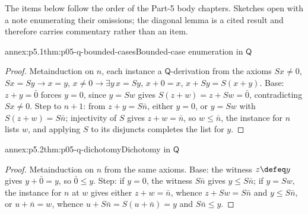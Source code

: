 \label{annex:p05}

The items below follow the order of the Part-5 body chapters.  Sketches
open with a note enumerating their omissions; the diagonal lemma is a
cited result and therefore carries commentary rather than an item.

\begin{annexitem}{annex:p5.1}{thm:p05-q-bounded-cases}{Bounded-case enumeration in \(\mathsf Q\)}
\begin{proof}
Metainduction on \(n\), each instance a \(\mathsf Q\)-derivation from
the axioms \(Sx\neq0\), \(Sx=Sy\to x=y\), \(x\neq0\to\exists y\,x=Sy\),
\(x+0=x\), \(x+Sy=S(x+y)\).  Base: \(z+y=\bar0\) forces \(y=0\), since
\(y=Sw\) gives \(S(z+w)=z+Sw=\bar0\), contradicting \(Sx\neq0\).  Step
to \(n+1\): from \(z+y=S\bar n\), either \(y=0\), or \(y=Sw\) with
\(S(z+w)=S\bar n\); injectivity of \(S\) gives \(z+w=\bar n\), so
\(w\leq\bar n\), the instance for \(n\) lists \(w\), and applying \(S\)
to its disjuncts completes the list for \(y\).
\end{proof}
\end{annexitem}

\begin{annexitem}{annex:p5.2}{thm:p05-q-dichotomy}{Dichotomy in \(\mathsf Q\)}
\begin{proof}
Metainduction on \(n\) from the same axioms.  Base: the witness
\(z\defeq y\) gives \(y+\bar0=y\), so \(\bar0\leq y\).  Step: if
\(y=0\), the witness \(S\bar n\) gives \(y\leq S\bar n\); if \(y=Sw\),
the instance for \(n\) at \(w\) gives either \(z+w=\bar n\), whence
\(z+Sw=S\bar n\) and \(y\leq S\bar n\), or \(u+\bar n=w\), whence
\(u+S\bar n=S(u+\bar n)=y\) and \(S\bar n\leq y\).
\end{proof}
\end{annexitem}

